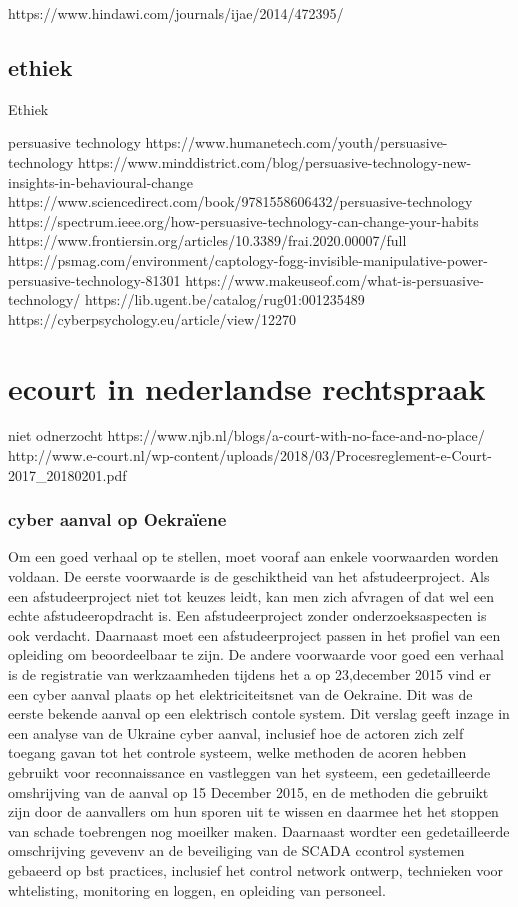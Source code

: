 https://www.hindawi.com/journals/ijae/2014/472395/ 


\subsection{ethiek}


Ethiek 



persuasive technology 
https://www.humanetech.com/youth/persuasive-technology 
https://www.minddistrict.com/blog/persuasive-technology-new-insights-in-behavioural-change 
https://www.sciencedirect.com/book/9781558606432/persuasive-technology 
https://spectrum.ieee.org/how-persuasive-technology-can-change-your-habits 
https://www.frontiersin.org/articles/10.3389/frai.2020.00007/full 
https://psmag.com/environment/captology-fogg-invisible-manipulative-power-persuasive-technology-81301 
https://www.makeuseof.com/what-is-persuasive-technology/ 
https://lib.ugent.be/catalog/rug01:001235489 
https://cyberpsychology.eu/article/view/12270 



\section{ecourt in nederlandse rechtspraak}
niet odnerzocht
https://www.njb.nl/blogs/a-court-with-no-face-and-no-place/ 
http://www.e-court.nl/wp-content/uploads/2018/03/Procesreglement-e-Court-2017_20180201.pdf

\subsubsection{ cyber aanval op Oekraïene }
Om een goed verhaal op te stellen, moet vooraf aan enkele voorwaarden
worden voldaan. De eerste voorwaarde is de geschiktheid van het
afstudeerproject. Als een afstudeerproject niet tot keuzes leidt, kan
men zich afvragen of dat wel een echte afstudeeropdracht is. Een
afstudeerproject zonder onderzoeksaspecten is ook verdacht. Daarnaast
moet een afstudeerproject passen in het profiel van een opleiding om
beoordeelbaar te zijn. De andere voorwaarde voor goed een verhaal is
de registratie van werkzaamheden tijdens het a
op 23,december 2015  vind er een cyber aanval plaats op het elektriciteitsnet van de Oekraine. Dit was de eerste bekende aanval op een elektrisch contole  system.  Dit verslag geeft inzage in een analyse van de Ukraine cyber aanval,
inclusief hoe de actoren zich zelf toegang gavan tot het controle systeem, welke methoden de acoren hebben gebruikt voor reconnaissance en vastleggen van het systeem, een gedetailleerde omshrijving van de aanval op 15 December 2015, en de methoden die gebruikt zijn door de aanvallers om hun sporen uit te wissen en daarmee het het stoppen van schade toebrengen  nog moeilker maken. Daarnaast wordter  een gedetailleerde omschrijving gevevenv an de beveiliging van de SCADA ccontrol systemen gebaeerd op bst practices, inclusief het control network ontwerp, technieken voor whtelisting, monitoring en loggen, en  opleiding van personeel.
\cite{Whitehead2017ukrainepoweroutage}


